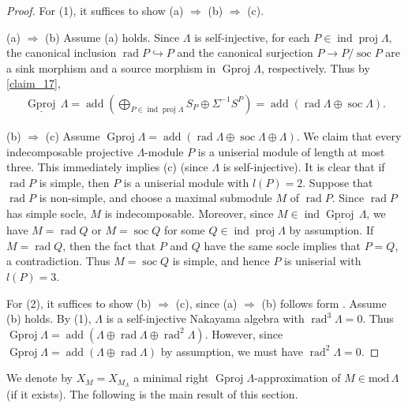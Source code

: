\documentclass[12pt]{amsart}
\numberwithin{equation}{subsection}
\theoremstyle{plain}
\theoremstyle{definition}
\newcommand{\rad}{\operatorname{rad}}
\newcommand{\soc}{\operatorname{soc}\nolimits}
\newcommand{\add}{\operatorname{add}}
\renewcommand{\mod}{\mathrm{mod}\,}
\newcommand{\proj}{\operatorname{proj}}
\newcommand{\Gproj}{\operatorname{Gproj}}
\newcommand{\sGproj}{\underline{\operatorname{Gproj}}\,}
\newcommand{\ind}{\operatorname{ind}}
\renewcommand{\L}{\Lambda}
\begin{document}
\begin{proof}



For (1), it suffices to show (a) $\Rightarrow$ (b) $\Rightarrow$ (c).


(a) $\Rightarrow$ (b)
Assume (a) holds.
Since $\L$ is self-injective, for each $P\in\ind\proj\L$, the canonical inclusion $\rad P \hookrightarrow P$ and the canonical surjection $P\to P/\soc P$ are a sink morphism and a source morphism in $\Gproj\L$, respectively.
Thus by \cref{claim_17},  
\begin{align}
\textstyle 
    \sGproj\L =\add\left(\bigoplus_{P\in\ind\proj\L} S_P \oplus \Sigma^{-1}S^P\right) = \add \left(\rad\L\oplus\soc\L\right).
\end{align}




(b) $\Rightarrow$ (c)
Assume  $\Gproj\L = \add \left(\rad\L\oplus\soc\L\oplus\L\right).$
We claim that every indecomposable projective $\L$-module $P$ is a uniserial module of length at most three.
This immediately implies (c) (since $\L$ is self-injective).
It is clear that if $\rad P$ is simple, then $P$ is a uniserial module with $l(P)=2$.  
Suppose that $\rad P$ is non-simple, and choose a maximal submodule $M$ of $\rad P$.
Since $\rad P$ has simple socle, $M$ is indecomposable.
Moreover, since $M\in\ind\sGproj\L$, we have $M=\rad Q$ or $M=\soc Q$ for some $Q\in\ind\proj\L$ by assumption.
If $M=\rad Q$, then the fact that $P$ and $Q$ have the same socle implies that $P=Q$, a contradiction.
Thus $M=\soc Q$ is simple, and hence $P$ is uniserial with $l(P)=3$.





For (2), it suffices to show (b) $\Rightarrow$ (c), since (a) $\Rightarrow$ (b) follows form \cite[Proposition 3.13]{Hafezi-Bahlekeh_2024}.
Assume (b) holds.
By (1), $\L$ is a self-injective Nakayama algebra with $\rad^3\L=0$.
Thus $\Gproj\L=\add(\L\oplus\rad\L\oplus\rad^2\L)$.
However, since $\Gproj\L=\add(\L\oplus\rad\L)$ by assumption, we must have $\rad^2\L=0$.
\end{proof}



We denote by $X_M=X_{M_\L}$  a minimal right $\Gproj\L$-approximation of $M\in\mod\L$ (if it exists).
The following is the main result of this section.
\end{document}
